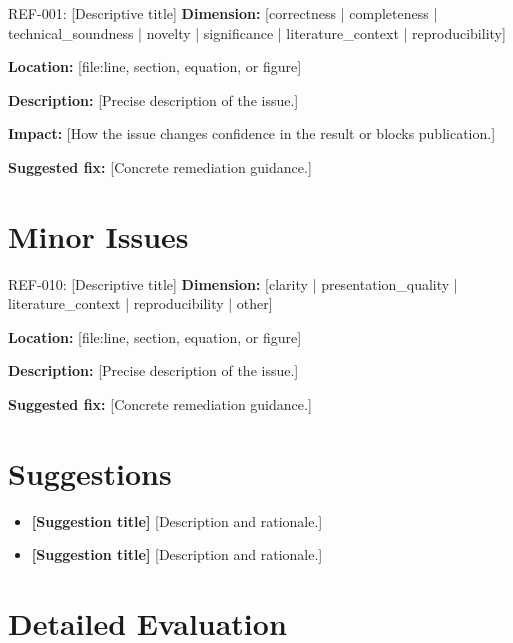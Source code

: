 \documentclass[11pt]{article}
\begin{document}
\begin{MajorIssueBox}{REF-001: [Descriptive title]}
\textbf{Dimension:} [correctness | completeness | technical\_soundness | novelty | significance | literature\_context | reproducibility]

\textbf{Location:} [file:line, section, equation, or figure]

\textbf{Description:} [Precise description of the issue.]

\textbf{Impact:} [How the issue changes confidence in the result or blocks publication.]

\textbf{Suggested fix:} [Concrete remediation guidance.]
\end{MajorIssueBox}

\section*{Minor Issues}

\begin{MinorIssueBox}{REF-010: [Descriptive title]}
\textbf{Dimension:} [clarity | presentation\_quality | literature\_context | reproducibility | other]

\textbf{Location:} [file:line, section, equation, or figure]

\textbf{Description:} [Precise description of the issue.]

\textbf{Suggested fix:} [Concrete remediation guidance.]
\end{MinorIssueBox}

\section*{Suggestions}
\begin{itemize}
  \item \textbf{[Suggestion title]} [Description and rationale.]
  \item \textbf{[Suggestion title]} [Description and rationale.]
\end{itemize}

\section*{Detailed Evaluation}
\end{document}
